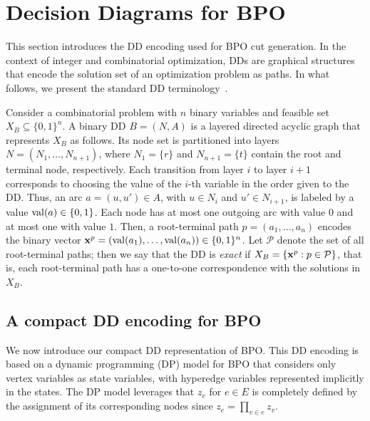 \section{Decision Diagrams for BPO}
\label{sec:dds_for_bpo}

This section introduces the DD encoding used for BPO cut generation. In the context of integer and combinatorial optimization, DDs are graphical structures that encode the solution set of an optimization problem as paths. In what follows, we present the standard DD terminology~\cite{bergman2016decision,castroCireBeck2022survey,vanHoeve2024intro}.


Consider a combinatorial problem with $n$ binary variables and feasible set $X_B\subseteq\{0,1\}^n$.
A binary DD $B=(N,A)$ is a layered directed acyclic graph that represents $X_B$ as follows. Its node set is partitioned into layers $N=(N_1,\ldots,N_{n+1})$, where $N_1=\{r\}$ and $N_{n+1}=\{t\}$ contain the root and terminal node, respectively. Each transition from layer $i$ to layer $i+1$ corresponds to choosing the value of the
$i$-th variable in the order given to the DD. Thus, an arc $a=(u,u')\in A$, with
$u\in N_i$ and $u'\in N_{i+1}$, is labeled by a value $\operatorname{val}(a)\in\{0,1\}$. Each node
has at most one outgoing arc with value $0$ and at most one with value $1$. Then, a root-terminal path $p=(a_1,\ldots,a_n)$ encodes the binary vector $\mathbf{x}^p=(\operatorname{val}(a_1),\ldots,\operatorname{val}(a_n))\in\{0,1\}^n$. Let $\mathcal{P}$ denote the set of all root-terminal paths; then we say that the DD is \emph{exact} if $X_B=\{\mathbf{x}^p:p\in\mathcal{P}\}$, that is, each root-terminal path has a one-to-one correspondence with the solutions in $X_B$. 


\subsection{A compact DD encoding for BPO} \label{subsec:compact_DD_bpo}

We now introduce our compact DD representation of BPO. This DD encoding is based on a dynamic programming (DP) model for BPO that considers only vertex variables as state variables, with hyperedge variables represented implicitly in the states. The DP model leverages that $z_e$ for $e \in E$ is completely defined by the assignment of its corresponding nodes since $z_e = \prod_{v \in e} z_v$.

